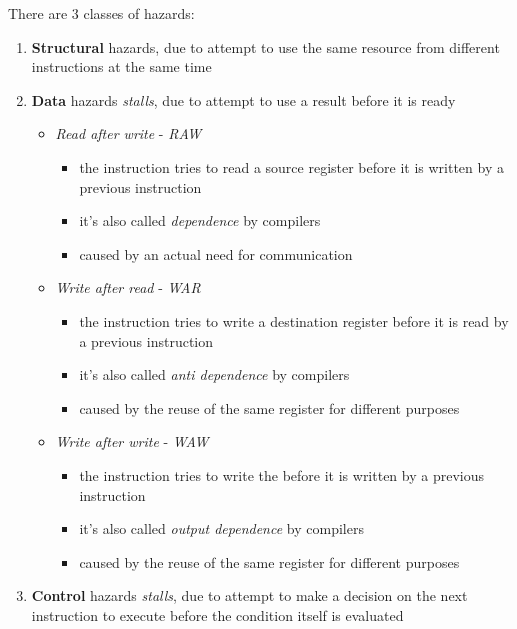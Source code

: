 \documentclass[english]{article}
\begin{document}
There are \(3\) classes of hazards:
\begin{enumerate}
  \item \textbf{Structural} hazards, due to attempt to use the same resource from different instructions at the same time
  \item \textbf{Data} hazards \textit{stalls}, due to attempt to use a result before it is ready
        \begin{itemize}
          \item \textit{Read after write} - \textit{RAW}
                \begin{itemize}[label=\(\rightarrow\)]
                  \item the instruction tries to read a source register before it is written by a previous instruction
                  \item it's also called \textit{dependence} by compilers
                  \item caused by an actual need for communication
                \end{itemize}
          \item \textit{Write after read} - \textit{WAR}
                \begin{itemize}[label=\(\rightarrow\)]
                  \item the instruction tries to write a destination register before it is read by a previous instruction
                  \item it's also called \textit{anti dependence} by compilers
                  \item caused by the reuse of the same register for different purposes
                \end{itemize}
          \item \textit{Write after write} - \textit{WAW}
                \begin{itemize}[label=\(\rightarrow\)]
                  \item the instruction tries to write the before it is written by a previous instruction
                  \item it's also called \textit{output dependence} by compilers
                  \item caused by the reuse of the same register for different purposes
                \end{itemize}
        \end{itemize}
  \item \textbf{Control} hazards \textit{stalls}, due to attempt to make a decision on the next instruction to execute before the condition itself is evaluated
\end{enumerate}
\end{document}
